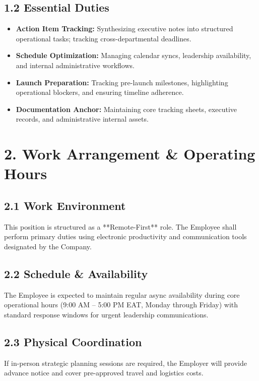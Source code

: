 \documentclass[11pt,a4paper]{article}
\begin{document}
\subsection{1.2 Essential Duties}
\begin{itemize}
    \item \textbf{Action Item Tracking:} Synthesizing executive notes into structured operational tasks; tracking cross-departmental deadlines.
    \item \textbf{Schedule Optimization:} Managing calendar syncs, leadership availability, and internal administrative workflows.
    \item \textbf{Launch Preparation:} Tracking pre-launch milestones, highlighting operational blockers, and ensuring timeline adherence.
    \item \textbf{Documentation Anchor:} Maintaining core tracking sheets, executive records, and administrative internal assets.
\end{itemize}

\section{2. Work Arrangement \& Operating Hours}

\subsection{2.1 Work Environment}
This position is structured as a **Remote-First** role. The Employee shall perform primary duties using electronic productivity and communication tools designated by the Company.

\subsection{2.2 Schedule \& Availability}
The Employee is expected to maintain regular async availability during core operational hours (9:00 AM -- 5:00 PM EAT, Monday through Friday) with standard response windows for urgent leadership communications.

\subsection{2.3 Physical Coordination}
If in-person strategic planning sessions are required, the Employer will provide advance notice and cover pre-approved travel and logistics costs.

\newpage
\end{document}
